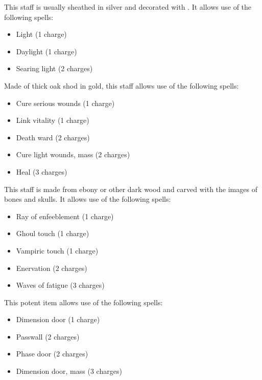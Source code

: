 
 This staff is usually sheathed in silver and decorated with . It allows use of the following spells:
\begin{itemize}
\item Light (1 charge)
\item Daylight (1 charge)
\item Searing light (2 charges)
\end{itemize}


 Made of thick oak shod in gold, this staff allows use of the following spells:
\begin{itemize}
\item Cure serious wounds (1 charge)
\item Link vitality (1 charge)
\item Death ward (2 charges)
\item Cure light wounds, mass (2 charges)
\item Heal (3 charges)
\end{itemize}


 This staff is made from ebony or other dark wood and carved with the images of bones and skulls. It allows use of the following spells:
\begin{itemize}
\item Ray of enfeeblement (1 charge)
\item Ghoul touch (1 charge)
\item Vampiric touch (1 charge)
\item Enervation (2 charges)
\item Waves of fatigue (3 charges)
\end{itemize}


 This potent item allows use of the following spells:
\begin{itemize}
\item Dimension door (1 charge)
\item Passwall (2 charges)
\item Phase door (2 charges)
\item Dimension door, mass (3 charges)
\end{itemize}

